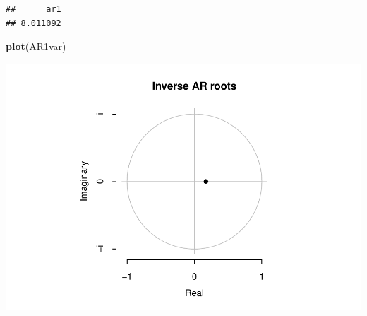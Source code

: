 \documentclass[11pt, a4paper]{report}
\newenvironment{Shaded}{\begin{snugshade}}{\end{snugshade}}
\newcommand{\DecValTok}[1]{\textcolor[rgb]{0.00,0.00,0.81}{#1}}
\newcommand{\KeywordTok}[1]{\textcolor[rgb]{0.13,0.29,0.53}{\textbf{#1}}}
\newcommand{\NormalTok}[1]{#1}
\newcommand{\OperatorTok}[1]{\textcolor[rgb]{0.81,0.36,0.00}{\textbf{#1}}}
\theoremstyle{plain}
\theoremstyle{plain}
\theoremstyle{remark}
\begin{document}
\begin{Shaded}
\end{Shaded}

\begin{verbatim}
##      ar1 
## 8.011092
\end{verbatim}

\begin{Shaded}
\begin{Highlighting}[]
\KeywordTok{plot}\NormalTok{(AR1var)}
\end{Highlighting}
\end{Shaded}

\begin{center}\includegraphics{Econo2_P1_files/figure-latex/var1-1} \end{center}

\begin{Shaded}
\end{Shaded}
\end{document}
